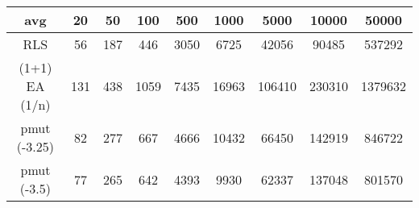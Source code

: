 \begin{tabular}[h]{ccccccccc}
avg&20&50&100&500&1000&5000&10000&50000\\\hline
RLS&56&187&446&3050&6725&42056&90485&537292\\
(1+1) EA (1/n)&131&438&1059&7435&16963&106410&230310&1379632\\
pmut (-3.25)&82&277&667&4666&10432&66450&142919&846722\\
pmut (-3.5)&77&265&642&4393&9930&62337&137048&801570\\
\end{tabular}
